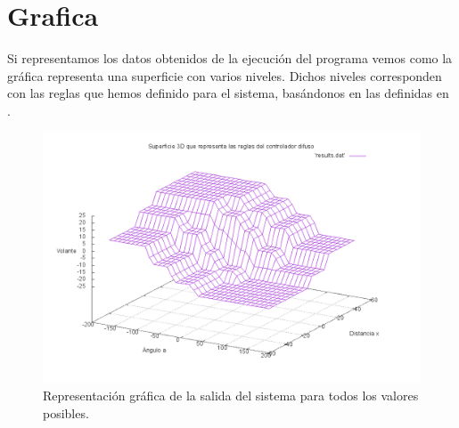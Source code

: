 \section{Grafica}

Si representamos los datos obtenidos de la ejecución del programa
vemos como la gráfica representa una superficie con varios
niveles. Dichos niveles corresponden con las reglas que hemos definido
para el sistema, basándonos en las definidas en \cite{kosko1992}.

\begin{figure}
\includegraphics[width=\textwidth,height=\textheight,keepaspectratio]{superficie-resultado.png}
\caption{Representación gráfica de la salida del sistema para todos
  los valores posibles.}
\label{img:grafica2}
\end{figure}
